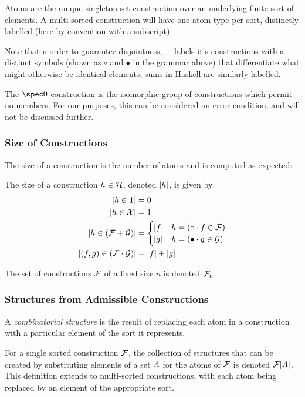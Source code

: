 Atoms are the unique singleton-set construction over an underlying finite sort of elements.
A multi-sorted construction will have one atom type per sort,
distinctly labelled (here by convention with a subscript).

Note that n order to guarantee disjointness,
$+$ labels it's constructions with a distinct symbols
(shown as  $\circ$ and $\bullet$ in the grammar above) 
that differentiate what might otherwise be identical elements;
sums in Haskell are similarly labelled.

The $\spec0$ construction is the isomorphic group of constructions which permit no members.
For our purposes, this can be considered an error condition, and will not be discussed further.

\subsubsection{Size of Constructions}
The size of a construction is the number of atoms 
and is computed as expected:

\begin{df}
The size of a construction $h \in \mathcal{H}$, denoted $\lvert h\rvert$, is given by
\begin{align}
 \lvert h \in \mathbf{1} \rvert & = 0 \\
\lvert h \in \mathcal{X}\rvert& = 1 \\
\lvert h \in (\mathcal{F} + \mathcal{G})\rvert & =
      \begin{cases} \lvert f\rvert & h = (\circ \cdot f \in \mathcal{F})\\
                              \lvert g\rvert & h = (\bullet \cdot g \in \mathcal{G}) 
       \end{cases}\\
\lvert(f,g) \in (\mathcal{F} \cdot \mathcal{G})\rvert & = \lvert f\rvert + \lvert g\rvert 
\end{align}
\end{df}

\noindent
The set of constructions $\mathcal{F}$ of a fixed size $n$ is denoted $\mathcal{F}_{n}$.

\subsubsection{Structures from Admissible Constructions}
A \emph{combinatorial structure} is the result of replacing each atom in a construction
with a particular element of the sort it represents.

\begin{df}
For a single sorted construction $\mathcal{F}$, 
the collection of structures that can be created by substituting 
elements of a set $\mathit{A}$ for the atoms of $\mathcal{F}$ is denoted $\mathcal{F}[\mathit{A}]$.
This definition extends to multi-sorted constructions,
with each atom being replaced by an element of the appropriate sort. 
\end{df}

